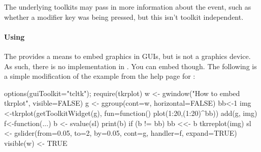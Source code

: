 The underlying toolkits may pass in more information about the event,
such as whether a modifier key was being pressed, but this isn't
toolkit independent.

\paragraph{Using } The  provides a means to embed
graphics in  GUIs, but is not a graphics device. As such,
there is no  implementation in
. You can embed  though. The
following is a simple modification of the example from the help page for :

\begin{Schunk}
\begin{Sinput}
 options(guiToolkit="tcltk"); require(tkrplot)
 w <- gwindow("How to embed tkrplot", visible=FALSE)
 g <- ggroup(cont=w, horizontal=FALSE)
 bb<-1
 img <-tkrplot(getToolkitWidget(g), 
               fun=function() plot(1:20,(1:20)^bb))
 add(g, img)
 f<-function(...) {
   b <- svalue(sl)
   print(b)
   if (b != bb) {
     bb <<- b
     tkrreplot(img)
   }
 }
 sl <- gslider(from=0.05, to=2, by=0.05, cont=g, 
               handler=f, expand=TRUE)
 visible(w) <- TRUE
 
\end{Sinput}
\end{Schunk}


